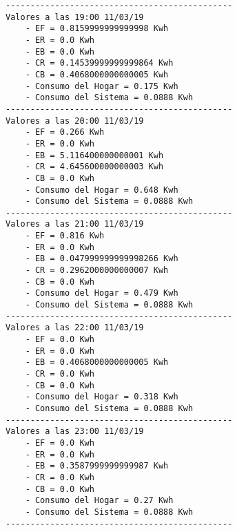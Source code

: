 \begin{lstlisting}[numbers=none,caption={Reporte de simulación 11/04},label={lst:simulationReport}]
----------------------------------------------
Valores a las 19:00 11/03/19
	- EF = 0.8159999999999998 Kwh
	- ER = 0.0 Kwh
	- EB = 0.0 Kwh
	- CR = 0.14539999999999864 Kwh
	- CB = 0.4068000000000005 Kwh
	- Consumo del Hogar = 0.175 Kwh
	- Consumo del Sistema = 0.0888 Kwh
----------------------------------------------
Valores a las 20:00 11/03/19
	- EF = 0.266 Kwh
	- ER = 0.0 Kwh
	- EB = 5.116400000000001 Kwh
	- CR = 4.645600000000003 Kwh
	- CB = 0.0 Kwh
	- Consumo del Hogar = 0.648 Kwh
	- Consumo del Sistema = 0.0888 Kwh
----------------------------------------------
Valores a las 21:00 11/03/19
	- EF = 0.816 Kwh
	- ER = 0.0 Kwh
	- EB = 0.047999999999998266 Kwh
	- CR = 0.2962000000000007 Kwh
	- CB = 0.0 Kwh
	- Consumo del Hogar = 0.479 Kwh
	- Consumo del Sistema = 0.0888 Kwh
----------------------------------------------
Valores a las 22:00 11/03/19
	- EF = 0.0 Kwh
	- ER = 0.0 Kwh
	- EB = 0.4068000000000005 Kwh
	- CR = 0.0 Kwh
	- CB = 0.0 Kwh
	- Consumo del Hogar = 0.318 Kwh
	- Consumo del Sistema = 0.0888 Kwh
----------------------------------------------
Valores a las 23:00 11/03/19
	- EF = 0.0 Kwh
	- ER = 0.0 Kwh
	- EB = 0.3587999999999987 Kwh
	- CR = 0.0 Kwh
	- CB = 0.0 Kwh
	- Consumo del Hogar = 0.27 Kwh
	- Consumo del Sistema = 0.0888 Kwh
----------------------------------------------
\end{lstlisting}
